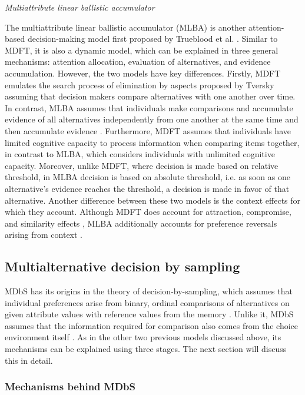 \documentclass[a4paper,12pt]{article}
\newcommand{\citeyearonly}[1]{\citeyearpar{#1}}
\begin{document}
\textit{Multiattribute linear ballistic accumulator}

The multiattribute linear ballistic accumulator (MLBA) is another attention-based decision-making model first proposed by Trueblood et al. \citeyearonly{trueblood2014multiattribute}. Similar to MDFT, it is also a dynamic model, which can be explained in three general mechanisms: attention allocation, evaluation of alternatives, and evidence accumulation. However, the two models have key differences. Firstly, MDFT emulates the search process of elimination by aspects proposed by Tversky \citeyearonly{tversky1972elimination} assuming that decision makers compare alternatives with one another over time. In contrast, MLBA assumes that individuals make comparisons and accumulate evidence of all alternatives independently from one another at the same time and then accumulate evidence \citep{trueblood15fragile}. Furthermore, MDFT assumes that individuals have limited cognitive capacity to process information when comparing items together, in contrast to MLBA, which considers individuals with unlimited cognitive capacity. Moreover, unlike MDFT, where decision is made based on relative threshold, in MLBA decision is based on absolute threshold, i.e. as soon as one alternative's evidence reaches the threshold, a decision is made in favor of that alternative. Another difference between these two models is the context effects for which they account. Although MDFT does account for attraction, compromise, and similarity effects \citep{hotaling2019quantitative}, MLBA additionally accounts for preference reversals arising from context \citep{trueblood15fragile}. 


\subsection{Multialternative decision by sampling}

MDbS has its origins in the theory of decision-by-sampling, which assumes that individual preferences arise from binary, ordinal comparisons of alternatives on given attribute values with reference values from the memory \citep{stewart2006decision}. Unlike it, MDbS assumes that the information required for comparison also comes from the choice environment itself \citep{noguchi2018multialternative}. As in the other two previous models discussed above, its mechanisms can be explained using three stages. The next section will discuss this in detail.

\subsubsection{Mechanisms behind MDbS} \label{subsec:mechanismMDBS}
\end{document}
